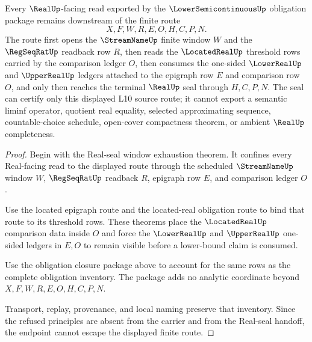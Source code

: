 \begin{theorem}
\label{thm:lower-semicontinuous-realseal-nonescape}
Every $\RealUp$-facing read exported by the $\LowerSemicontinuousUp$ obligation package remains downstream of the finite route
$$
X,F,W,R,E,O,H,C,P,N .
$$
The route first opens the $\StreamNameUp$ finite window $W$ and the $\RegSeqRatUp$ readback row $R$, then reads the $\LocatedRealUp$ threshold rows carried by the comparison ledger $O$, then consumes the one-sided $\LowerRealUp$ and $\UpperRealUp$ ledgers attached to the epigraph row $E$ and comparison row $O$, and only then reaches the terminal $\RealUp$ seal through $H,C,P,N$. The seal can certify only this displayed L10 source route; it cannot export a semantic liminf operator, quotient real equality, selected approximating sequence, countable-choice schedule, open-cover compactness theorem, or ambient $\RealUp$ completeness.
\end{theorem}
\begin{proof}
Begin with the Real-seal window exhaustion theorem. It confines every Real-facing read to the displayed route through the scheduled $\StreamNameUp$ window $W$, $\RegSeqRatUp$ readback $R$, epigraph row $E$, and comparison ledger $O$.

Use the located epigraph route and the located-real obligation route to bind that route to its threshold rows. These theorems place the $\LocatedRealUp$ comparison data inside $O$ and force the $\LowerRealUp$ and $\UpperRealUp$ one-sided ledgers in $E,O$ to remain visible before a lower-bound claim is consumed.

Use the obligation closure package above to account for the same rows as the complete obligation inventory. The package adds no analytic coordinate beyond $X,F,W,R,E,O,H,C,P,N$.

Transport, replay, provenance, and local naming preserve that inventory. Since the refused principles are absent from the carrier and from the Real-seal handoff, the endpoint cannot escape the displayed finite route.
\end{proof}

